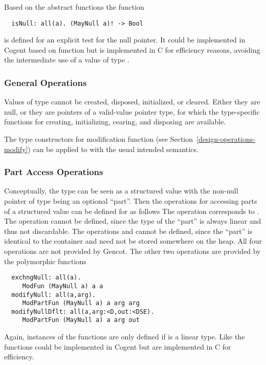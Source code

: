 Based on the abstract functions the function
\begin{verbatim}
  isNull: all(a). (MayNull a)! -> Bool
\end{verbatim}
is defined for an explicit test for the null pointer. It could be implemented in Cogent based on function  but
is implemented in C for efficiency reasons, avoiding the intermediate use of a value of type .

\subsubsection{General Operations}

Values of type  cannot be created, disposed, initialized, or cleared. Either they are null, or they are pointers of
a valid-value pointer type, for which the type-specific functions for creating, initializing, cearing, and disposing are available.

The type constructors for modification function (see Section~\ref{design-operations-modify}) can be applied to  
with the usual intended semantics.

\subsubsection{Part Access Operations}

Conceptually, the type  can be seen as a structured value with the non-null pointer of type  being
an optional ``part''. Then the operations for accessing parts of a structured value can be defined for  as follows
The operation  corresponds to . The operation  cannot be defined, since the type  of the 
``part'' is always linear and thus not discardable. The operations  and  cannot be defined, since
the ``part'' is identical to the container and need not be stored somewhere on the heap. 
All four operations are not provided by Gencot. The other two operations are provided
by the polymorphic functions
\begin{verbatim}
  exchngNull: all(a).
     ModFun (MayNull a) a a
  modifyNull: all(a,arg).
     ModPartFun (MayNull a) a arg arg
  modifyNullDflt: all(a,arg:<D,out:<DSE).
     ModPartFun (MayNull a) a arg out
\end{verbatim}
Again, instances of the functions are only defined if  is a linear type. Like  the functions could be 
implemented in Cogent but are implemented in C for efficiency.

